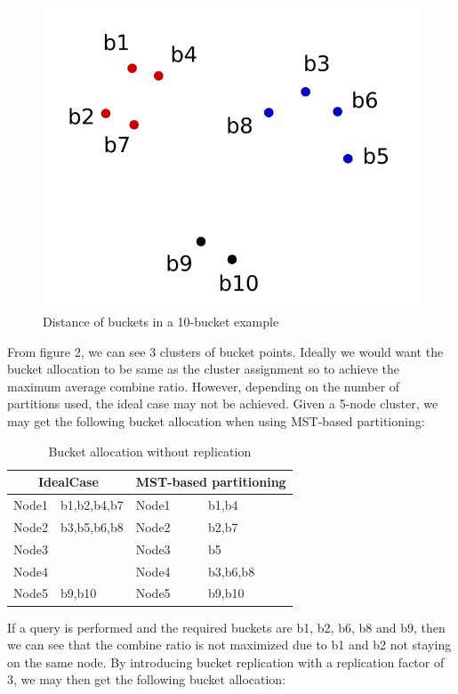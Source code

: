 \documentclass{vldb}
\begin{document}
\begin{figure}
\centering
\includegraphics[scale=0.5]{fig2}
\caption{Distance of buckets in a 10-bucket example}
\label{fig:fig2}
\end{figure}

From figure 2, we can see 3 clusters of bucket points. Ideally we would want the bucket allocation to be same as the cluster assignment so to achieve the maximum average combine ratio. However, depending on the number of partitions used, the ideal case may not be achieved. Given a 5-node cluster, we may get the following bucket allocation when using MST-based partitioning:

\begin{table}
\begin{tabular}{|l|l|l|l|}
\hline
\multicolumn{2}{|c|}{IdealCase} &
\multicolumn{2}{c|}{MST-based partitioning}\\
\hline
Node1 & b1,b2,b4,b7 & Node1 & b1,b4\\
\hline
Node2 & b3,b5,b6,b8 & Node2 & b2,b7\\
\hline
Node3 &  & Node3 & b5\\
\hline
Node4 &  & Node4 & b3,b6,b8\\
\hline
Node5 & b9,b10 & Node5 & b9,b10\\
\hline
\end{tabular}
\center
\caption{Bucket allocation without replication}
\center
\end{table}

If a query is performed and the required buckets are b1, b2, b6, b8 and b9, then we can see that the combine ratio is not maximized due to b1 and b2 not staying on the same node. By introducing bucket replication with a replication factor of 3, we may then get the following bucket allocation:
\end{document}
